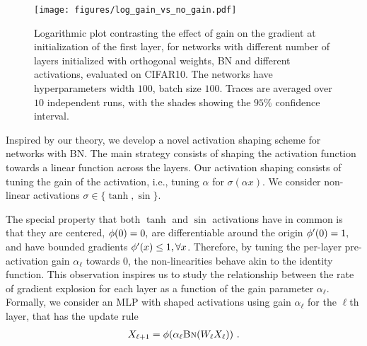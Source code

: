 \begin{figure}[ht] 
  \centering
  \texttt{[image: figures/log\_gain\_vs\_no\_gain.pdf]}
  \vspace{-.2cm}
  \caption{Logarithmic plot contrasting the effect of gain on the gradient at initialization of the first layer, for networks with different number of layers initialized with orthogonal weights, BN and different activations, evaluated on CIFAR10. The networks have hyperparameters width $100$, batch size $100$. Traces are averaged over $10$ independent runs, with the shades showing the $95\%$ confidence interval.}
  \label{grad:fig:gain_effect}
\end{figure}
Inspired by our theory, we develop a novel activation shaping scheme for networks with BN. The main strategy consists of shaping the activation function towards a linear function across the layers. Our activation shaping consists of tuning the gain of the activation, i.e., tuning $\alpha$ for $\sigma(\alpha x).$ We consider non-linear activations $\sigma \in \{\tanh, \sin\}.$  


The special property that both $\tanh$ and $\sin$ activations have in common is that they are centered, $\phi(0)=0,$ are differentiable around the origin $\phi'(0)=1,$ and have bounded gradients $\phi'(x) \leq 1, \forall x$. Therefore, by tuning the per-layer pre-activation gain $\alpha_\ell$ towards $0$, the non-linearities behave akin to the identity function. This observation inspires us to study the relationship between the rate of gradient explosion for each layer as a function of the gain parameter $\alpha_\ell$. Formally, we consider an MLP with shaped activations using gain $\alpha_\ell$ for the $\ell$th layer, that has the update rule
\begin{align}
    X_{\ell + 1} = \phi(\alpha_\ell \text{\sc{Bn}}(W_\ell X_\ell))~.
    \label{grad:eqn:mlp_nonlinear}
\end{align}




